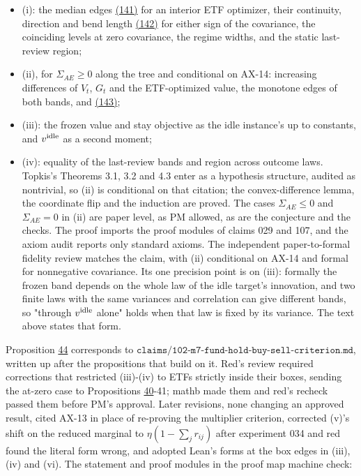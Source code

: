 \documentclass[11pt]{article}
\begin{document}
\begin{itemize}
  \item (i): the median edges \hyperref[eq:141]{(141)} for an interior ETF optimizer, their
  continuity, direction and bend length \hyperref[eq:142]{(142)} for either sign of the
  covariance, the coinciding levels at zero covariance, the regime
  widths, and the static last-review region;
  \item (ii), for \(\Sigma_{AE}\geq0\) along the tree and conditional on AX-14:
  increasing differences of \(V_t\), \(G_t\) and the ETF-optimized value,
  the monotone edges of both bands, and \hyperref[eq:143]{(143)};
  \item (iii): the frozen value and stay objective as the idle instance's
  up to constants, and \(v^{\rm idle}\) as a second moment;
  \item (iv): equality of the last-review bands and region across outcome
  laws.
Topkis's Theorems 3.1, 3.2 and 4.3 enter as a hypothesis structure,
audited as nontrivial, so (ii) is conditional on that citation; the
convex-difference lemma, the coordinate flip and the induction are
proved. The cases \(\Sigma_{AE}\leq0\) and \(\Sigma_{AE}=0\) in (ii) are paper level, as PM
allowed, as are the conjecture and the checks. The proof imports the
proof modules of claims 029 and 107, and the axiom audit reports only
standard axioms. The independent paper-to-formal fidelity review
matches the claim, with (ii) conditional on AX-14 and formal for
nonnegative covariance. Its one precision point is on (iii): formally
the frozen band depends on the whole law of the idle target's
innovation, and two finite laws with the same variances and
correlation can give different bands, so "through \(v^{\rm idle}\) alone" holds
when that law is fixed by its variance. The text above states that
form.
\end{itemize}

Proposition \hyperref[res:Proposition-44]{44} corresponds to
\(\texttt{claims/102-m7-fund-hold-buy-sell-criterion.md}\), written up after the
propositions that build on it. Red's review required corrections that
restricted (iii)-(iv) to ETFs strictly inside their boxes, sending the
at-zero case to Propositions \hyperref[res:Proposition-40]{40}-41; mathb made them and red's recheck
passed them before PM's approval. Later revisions, none changing an
approved result, cited AX-13 in place of re-proving the multiplier
criterion, corrected (v)'s shift on the reduced marginal to
\(\eta(1-\sum_jr_{ij})\) after experiment 034 and red found the literal form wrong,
and adopted Lean's forms at the box edges in (iii), (iv) and (vi). The
statement and proof modules in the proof map machine check:
\end{document}

